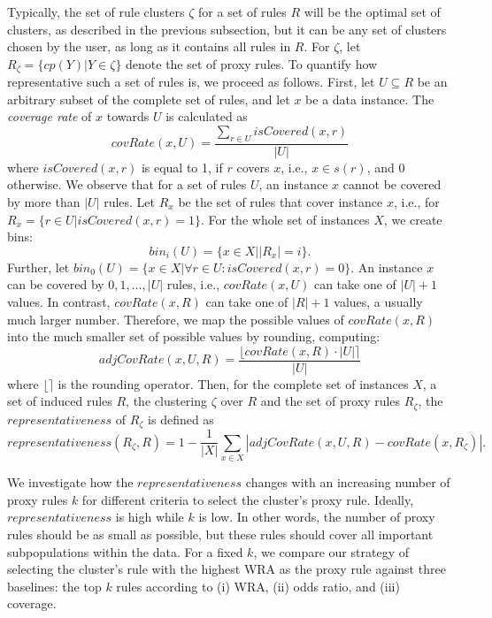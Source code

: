\documentclass[
  oneside]{book}
\begin{document}
Typically, the set of rule clusters \(\zeta\) for a set of rules \(R\) will be the optimal set of clusters, as described in the previous subsection, but it can be any set of clusters chosen by the user, as long as it contains all rules in \(R\).
For \(\zeta\), let \(R_{\zeta}=\{cp(Y)|Y\in\zeta\}\) denote the set of proxy rules.
To quantify how representative such a set of rules is, we proceed as follows.
First, let \(U\subseteq{}R\) be an arbitrary subset of the complete set of rules, and let \(x\) be a data instance.
The \emph{coverage rate} of \(x\) towards \(U\) is calculated as
\begin{equation}
covRate(x,U) = \frac{\sum_{r\in{}U}isCovered(x,r)}{|U|}
\label{eq:covRate}
\end{equation}
where \(isCovered(x,r)\) is equal to 1, if \(r\) covers \(x\), i.e., \(x\in s(r)\), and \(0\) otherwise.
We observe that for a set of rules \(U\), an instance \(x\) cannot be covered by more than \(|U|\) rules.
Let \(R_x\) be the set of rules that cover instance \(x\), i.e., for \(R_x=\{r\in{}U | isCovered(x,r)=1 \}\).
For the whole set of instances \(X\), we create bins:
\begin{equation}
bin_i(U)= \{x \in{}X | |R_x|=i \}.
\label{eq:bini}
\end{equation}
Further, let \(bin_0(U)= \{x \in{}X | \forall r\in U : isCovered(x,r)=0 \}\).
An instance \(x\) can be covered by \(0, 1, \ldots, |U|\) rules, i.e., \(covRate(x,U)\) can take one of \(|U|+1\) values.
In contrast, \(covRate(x,R)\) can take one of \(|R|+1\) values, a usually much larger number.
Therefore, we map the possible values of \(covRate(x,R)\) into the much smaller set of possible values by rounding, computing:
\begin{equation}
adjCovRate(x,U, R)=\frac{\lfloor covRate(x,R)\cdot|U| \rceil}{|U|}
\label{eq:adjCovRate}
\end{equation}
where \(\lfloor\rceil\) is the rounding operator.
Then, for the complete set of instances \(X\), a set of induced rules \(R\), the clustering \(\zeta\) over \(R\) and the set of proxy rules \(R_{\zeta}\), the \(representativeness\) of \(R_{\zeta}\) is defined as
\begin{equation}
representativeness(R_{\zeta},R)=1-
\frac{1}{|X|}\sum_{x\in{}X} |adjCovRate(x,U,R) - covRate(x,R_{\zeta})|.
\label{eq:representativeness}
\end{equation}

We investigate how the \(representativeness\) changes with an increasing number of proxy rules \(k\) for different criteria to select the cluster's proxy rule.
Ideally, \(representativeness\) is high while \(k\) is low.
In other words, the number of proxy rules should be as small as possible, but these rules should cover all important subpopulations within the data.
For a fixed \(k\), we compare our strategy of selecting the cluster's rule with the highest WRA as the proxy rule against three baselines: the top \(k\) rules according to (i) WRA, (ii) odds ratio, and (iii) coverage.
\end{document}

